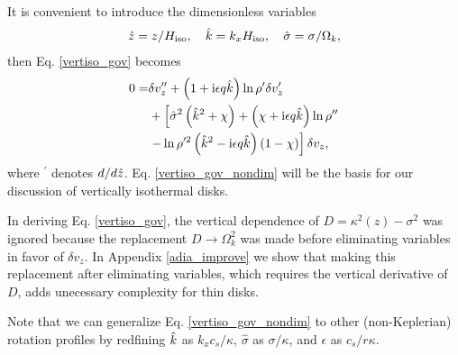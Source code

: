 It is convenient to introduce the dimensionless variables
\begin{align}
  \hat{z} = z/H_\mathrm{iso},\quad \hat{k}=k_xH_\mathrm{iso}, \quad \hat{\sigma} = \sigma/\Omega_k,
\end{align}
then Eq. \ref{vertiso_gov} becomes
\begin{align}
  0=& \delta v_z ^{\prime\prime} + \left(1 + \mathrm{i}\epsilon
    q\hat{k}\right)\ln\rho^{\prime}\delta v_z^\prime \notag\\
  &+
  \left[\hat{\sigma}^2\left(\hat{k}^2+\chi\right) +
    \left(  \chi + \mathrm{i} \epsilon q\hat{k}\right)\ln\rho^{\prime\prime}\right.
  \notag\\
  &\left.- \ln\rho^{\prime
      2}\left(\hat{k}^2 -
      \mathrm{i}\epsilon
      q\hat{k}\right)\left(1 - \chi\right)\right]\delta v_z,\label{vertiso_gov_nondim}
\end{align}
where $^\prime$ denotes $d/d\hat{z}$. Eq. \ref{vertiso_gov_nondim} will
be the basis for our discussion of vertically isothermal disks. %

In deriving Eq. \ref{vertiso_gov}, the vertical dependence of
$D=\kappa^2(z)-\sigma^2$ was ignored because the replacement
$D\to\Omega_k^2$ was made before eliminating variables in favor of
$\delta v_z$. In Appendix \ref{adia_improve} we show that making this
replacement after eliminating variables, which requires the vertical
derivative of $D$, adds unecessary complexity for thin disks.  


Note that we can generalize Eq. \ref{vertiso_gov_nondim} to other
(non-Keplerian) rotation profiles by redfining $\hat{k}$
as $k_xc_s/\kappa$, $\hat{\sigma}$ as $\sigma/\kappa$, and 
$\epsilon$ as $c_s/r\kappa$.    



